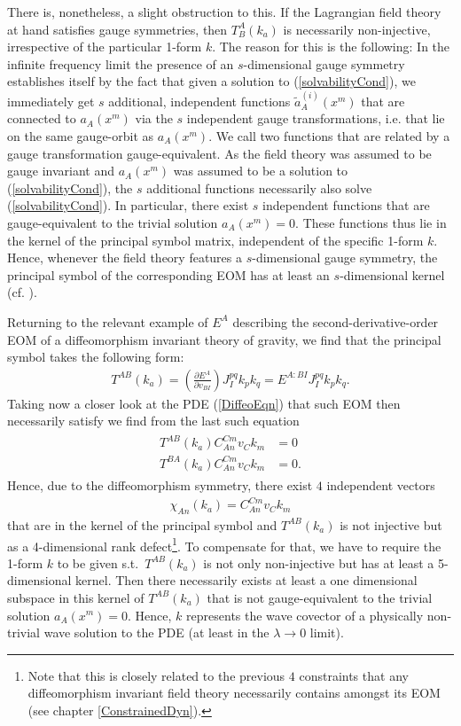 There is, nonetheless, a slight obstruction to this. If the Lagrangian field theory at hand satisfies gauge symmetries, then $T^A_B(k_a)$ is necessarily non-injective, irrespective of the particular 1-form $k$. The reason for this is the following: In the infinite frequency limit the presence of an $s$-dimensional gauge symmetry establishes itself by the fact that given a solution to (\ref{solvabilityCond}), we immediately get $s$ additional, independent functions $\tilde{a}^{(i)}_A(x^m)$ that are connected to $a_A(x^m)$ via the $s$ independent gauge transformations, i.e. that lie on the same gauge-orbit as $a_A(x^m)$. We call two functions that are related by a gauge transformation gauge-equivalent. As the field theory was assumed to be gauge invariant and $a_A(x^m)$ was assumed to be a solution to (\ref{solvabilityCond}), the $s$ additional functions necessarily also solve (\ref{solvabilityCond}). In particular, there exist $s$ independent functions that are gauge-equivalent to the trivial solution $a_A(x^m) = 0$.    
These functions thus lie in the kernel of the principal symbol matrix, independent of the specific 1-form $k$.
Hence, whenever the field theory features a $s$-dimensional gauge symmetry, the principal symbol of the corresponding EOM has at least an $s$-dimensional kernel (cf. \cite{2018PhRvD..97h4036D}). 

Returning to the relevant example of $E^A$ describing the second-derivative-order EOM of a diffeomorphism invariant theory of gravity, we find that the principal symbol takes the following form:
\begin{align}
    T^{A B} (k_a) = \left (\frac{\partial E^A}{\partial v_{BI}} \right )J_I^{pq} k_p k_q = E^{A: BI} J_I^{pq} k_p k_q.
\end{align}
Taking now a closer look at the PDE (\ref{DiffeoEqn}) that such EOM then necessarily  satisfy we find from the last such equation
\begin{align}\label{symbolDef}
\begin{aligned}
    T^{A B} (k_a) C_{An}^{Cm}v_Ck_m &= 0 \\
    T^{B A} (k_a) C_{An}^{Cm}v_Ck_m &= 0 .
\end{aligned}
\end{align}
Hence, due to the diffeomorphism symmetry, there exist $4$ independent vectors
\begin{align}
   \chi_{An}(k_a) =  C_{An}^{Cm}v_Ck_m
\end{align}
that are in the kernel of the principal symbol and $T^{AB}(k_a)$ is not injective but as a 4-dimensional rank defect\footnote{Note that this is closely related to the previous $4$ constraints that any diffeomorphism invariant field theory necessarily contains amongst its EOM (see chapter \ref{ConstrainedDyn}).}. To compensate for that, we have to require the 1-form $k$ to be given s.t.\ $T^{AB}(k_a)$ is not only non-injective but has at least a 5-dimensional kernel. Then there necessarily exists at least a one dimensional subspace in this kernel of $T^{AB}(k_a)$ that is not gauge-equivalent to the trivial solution $a_A(x^m) = 0$. Hence, $k$ represents the wave covector of a physically non-trivial wave solution to the PDE (at least in the $\lambda \rightarrow 0$ limit).

